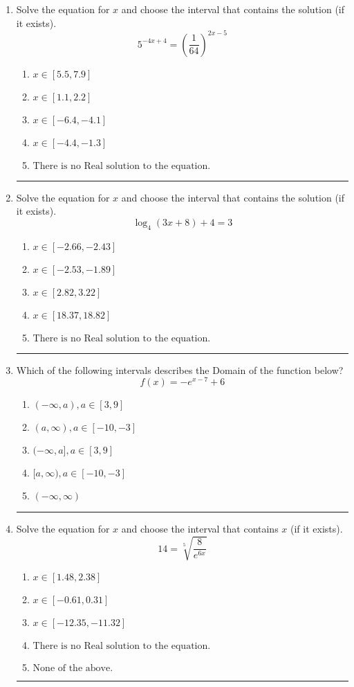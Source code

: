\documentclass[14pt]{extbook}
\newcommand{\litem}[1]{\item#1\hspace*{-1cm}\rule{\textwidth}{0.4pt}}
\begin{document}
\begin{enumerate}
\litem{
Solve the equation for $x$ and choose the interval that contains the solution (if it exists).\[ 5^{-4x+4} = \left(\frac{1}{64}\right)^{2x-5} \]\begin{enumerate}[label=\Alph*.]
\item \( x \in [5.5, 7.9] \)
\item \( x \in [1.1, 2.2] \)
\item \( x \in [-6.4, -4.1] \)
\item \( x \in [-4.4, -1.3] \)
\item \( \text{There is no Real solution to the equation.} \)

\end{enumerate} }
\litem{
Solve the equation for $x$ and choose the interval that contains the solution (if it exists).\[ \log_{4}{(3x+8)}+4 = 3 \]\begin{enumerate}[label=\Alph*.]
\item \( x \in [-2.66, -2.43] \)
\item \( x \in [-2.53, -1.89] \)
\item \( x \in [2.82, 3.22] \)
\item \( x \in [18.37, 18.82] \)
\item \( \text{There is no Real solution to the equation.} \)

\end{enumerate} }
\litem{
Which of the following intervals describes the Domain of the function below?\[ f(x) = -e^{x-7}+6 \]\begin{enumerate}[label=\Alph*.]
\item \( (-\infty, a), a \in [3, 9] \)
\item \( (a, \infty), a \in [-10, -3] \)
\item \( (-\infty, a], a \in [3, 9] \)
\item \( [a, \infty), a \in [-10, -3] \)
\item \( (-\infty, \infty) \)

\end{enumerate} }
\litem{
 Solve the equation for $x$ and choose the interval that contains $x$ (if it exists).\[  14 = \sqrt[5]{\frac{8}{e^{6x}}} \]\begin{enumerate}[label=\Alph*.]
\item \( x \in [1.48, 2.38] \)
\item \( x \in [-0.61, 0.31] \)
\item \( x \in [-12.35, -11.32] \)
\item \( \text{There is no Real solution to the equation.} \)
\item \( \text{None of the above.} \)


\end{enumerate}}
\end{enumerate}
\end{document}
